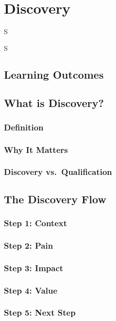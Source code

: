 \frenchspacing
\chapter{Discovery}
\epigraph{S}{S}

%
\section{Learning Outcomes}\mbox{}

\section{What is Discovery?}\mbox{}
    \subsection{Definition}\mbox{}
    \subsection{Why It Matters}\mbox{}
    \subsection{Discovery vs.\ Qualification}\mbox{}

\section{The Discovery Flow}\mbox{}
    \subsection{Step 1: Context}\mbox{}
    \subsection{Step 2: Pain}\mbox{}
    \subsection{Step 3: Impact}\mbox{}
    \subsection{Step 4: Value}\mbox{}
    \subsection{Step 5: Next Step}\mbox{}

